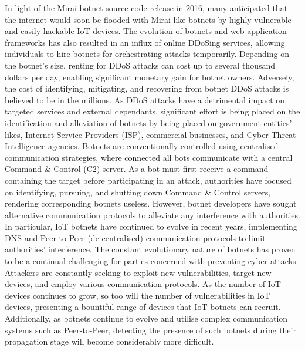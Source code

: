In light of the Mirai botnet source-code release in 2016, many anticipated that the internet would soon be flooded with Mirai-like botnets by highly vulnerable and easily hackable IoT devices. \citep{Krebs2016} The evolution of botnets and web application frameworks has also resulted in an influx of online DDoSing services, allowing individuals to hire botnets for orchestrating attacks temporarily. Depending on the botnet's size, renting for DDoS attacks can cost up to several thousand dollars per day, enabling significant monetary gain for botnet owners. \citep{Putman2018} Adversely, the cost of identifying, mitigating, and recovering from botnet DDoS attacks is believed to be in the millions. As DDoS attacks have a detrimental impact on targeted services and external dependants, significant effort is being placed on the identification and alleviation of botnets by being placed on government entities' likes, Internet Service Providers (ISP), commercial businesses, and Cyber Threat Intelligence agencies. Botnets are conventionally controlled using centralised communication strategies, where connected all bots communicate with a central Command \& Control (C2) server. As a bot must first receive a command containing the target before participating in an attack, authorities have focused on identifying, pursuing, and shutting down Command \& Control servers, rendering corresponding botnets useless. However, botnet developers have sought alternative communication protocols to alleviate any interference with authorities. In particular, IoT botnets have continued to evolve in recent years, implementing DNS and Peer-to-Peer (de-centralised) communication protocols to limit authorities' interference. The constant evolutionary nature of botnets has proven to be a continual challenging for parties concerned with preventing cyber-attacks. Attackers are constantly seeking to exploit new vulnerabilities, target new devices, and employ various communication protocols. As the number of IoT devices continues to grow, so too will the number of vulnerabilities in IoT devices, presenting a bountiful range of devices that IoT botnets can recruit. Additionally, as botnets continue to evolve and utilise complex communication systems such as Peer-to-Peer, detecting the presence of such botnets during their propagation stage will become considerably more difficult.

